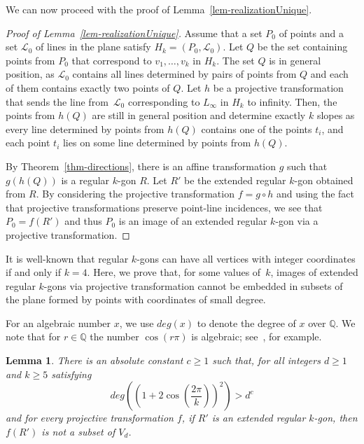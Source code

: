 \documentclass{article}
\newtheorem{lemma}[theorem]{Lemma}
\begin{document}
We can now proceed with the proof of Lemma~\ref{lem-realizationUnique}.

\begin{proof}[Proof of Lemma~\ref{lem-realizationUnique}]
Assume that a set $P_0$ of points and a set $\mathcal{L}_0$ of lines in the plane satisfy $H_k=(P_0,\mathcal{L}_0)$.
Let $Q$ be the set containing points from $P_0$ that correspond to $v_1,\dots,v_k$ in $H_k$.
The set $Q$ is in general position, as $\mathcal{L}_0$ contains all lines determined by pairs of points from $Q$ and each of them contains exactly two points of $Q$.
Let $h$ be a projective transformation that sends the line from~$\mathcal{L}_0$ corresponding to $L_\infty$ in $H_k$ to infinity. 
Then, the points from $h(Q)$ are still in general position and determine exactly $k$ slopes as every line determined by points from $h(Q)$ contains one of the points $t_i$, and each point $t_i$ lies on some line determined by points from $h(Q)$.

By Theorem~\ref{thm-directions}, there is an affine transformation $g$ such that $g(h(Q))$ is a regular $k$-gon $R$.
Let $R'$ be the extended regular $k$-gon obtained from $R$.
By considering the projective transformation $f = g \circ h$ and using the fact that projective transformations preserve point-line incidences, we see that $P_0 = f(R')$ and thus $P_0$ is an image of an extended regular $k$-gon via a projective transformation.
\end{proof}

It is well-known that regular $k$-gons can have all vertices with integer coordinates if and only if $k = 4$.
Here, we prove that, for some values of~$k$, images of extended regular $k$-gons via projective transformation cannot be embedded in subsets of the plane formed by points with coordinates of small degree.

For an algebraic number $x$, we use $deg(x)$ to denote the degree of $x$ over $\mathbb{Q}$.
We note that for $r \in \mathbb{Q}$ the number $\cos(r \pi)$ is algebraic; see~\cite{pss24}, for example.

\begin{lemma}
\label{lem-embedding}
There is an absolute constant $c \geq 1$ such that, for all integers $d \geq 1$ and $k \geq 5$ satisfying
\begin{equation}
\label{eq-condition}
deg\left(\left(1+2\cos\left(\frac{2\pi}{k}\right)\right)^2 \right) > d^c
\end{equation}
and for every projective transformation $f$, if $R'$ is an extended regular $k$-gon, then $f(R')$ is not a subset of $V_d$.
\end{lemma}
\end{document}
